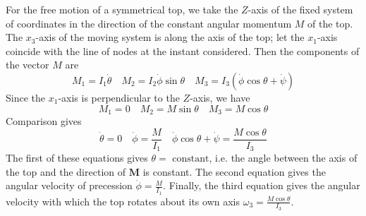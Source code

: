 For the free motion of a symmetrical top, we take the $Z$-axis of the fixed system of coordinates in the direction of the constant angular momentum $M$ of the top. The $x_3$-axis of the moving system is along the axis of the top; let the $x_1$-axis coincide with the line of nodes at the instant considered. 
Then the components of the vector $M$ are
\[M_1 = I_1\dot{\theta} \quad M_2 = I_2 \dot{\phi}\sin\theta \quad M_3 = I_3(\dot{\phi}\cos\theta + \dot{\psi})\]
Since the $x_1$-axis is perpendicular to the $Z$-axis, we have
\[M_1 = 0 \quad M_2 = M\sin\theta \quad M_3 = M\cos\theta\]
Comparison gives
\[\dot{\theta} = 0 \quad  \dot{\phi} = \frac{M}{I_1} \quad \dot{\phi}\cos\theta + \dot{\psi} = \frac{M\cos\theta}{I_3}\]
The first of these equations gives $\theta = \mbox{ constant} $, i.e. the angle between the axis of the top and the direction of $\bm{M}$ is constant. The second equation gives
the angular velocity of precession $\dot{\phi} = \frac{M}{I_1}$. Finally, the third equation gives the angular velocity with which the top rotates about its own axis $\omega_3 = \frac{M\cos\theta}{I_3}$.